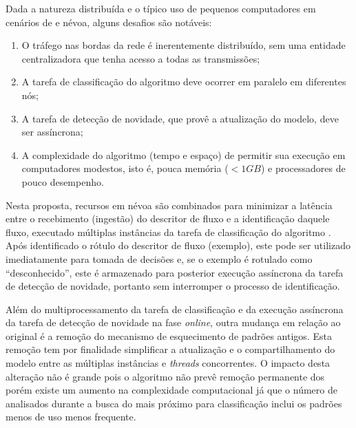 Dada a natureza distribuída e o típico uso de pequenos computadores em cenários
de \iot e névoa, alguns desafios são notáveis:
\begin{enumerate}[label=(\emph{\roman*})]

  \item O tráfego nas bordas da rede é inerentemente distribuído, sem uma
  entidade centralizadora que tenha acesso a todas as transmissões;
  
  \item A tarefa de classificação do algoritmo deve ocorrer em paralelo em
  diferentes nós;
  
  \item A tarefa de detecção de novidade, que provê a atualização do modelo,
  deve ser assíncrona;
    
  \item A complexidade do algoritmo (tempo e espaço) de permitir sua execução em
  computadores modestos, isto é, pouca memória ($< 1GB$) e processadores de
  pouco desempenho.

\end{enumerate}

Nesta proposta, recursos em névoa são combinados para minimizar a latência entre
o recebimento (ingestão) do descritor de fluxo e a identificação daquele fluxo,
executado múltiplas instâncias da tarefa de classificação do algoritmo \minas.
Após identificado o rótulo do descritor de fluxo (exemplo), este pode ser
utilizado imediatamente para tomada de decisões e, se o exemplo é rotulado como
``desconhecido'', este é armazenado para posterior execução assíncrona da tarefa
de detecção de novidade, portanto sem interromper o processo de identificação.

Além do multiprocessamento da tarefa de classificação e da execução assíncrona da
tarefa de detecção de novidade na fase \emph{online}, outra mudança em relação
ao \minas original é a remoção do mecanismo de esquecimento de padrões antigos.
Esta remoção tem por finalidade simplificar a atualização e o compartilhamento
do modelo entre as múltiplas instâncias e \emph{threads} concorrentes.
% 
O impacto desta alteração não é grande pois o algoritmo \minas não prevê remoção
permanente dos \mclusters porém existe um aumento na complexidade computacional
já que o número de \mclusters analisados durante a busca do mais próximo para
classificação inclui os padrões menos de uso menos frequente.

